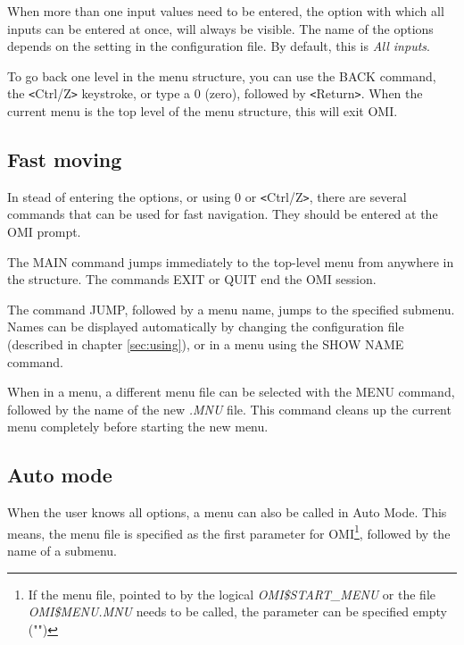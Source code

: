 \documentclass[a4paper]{book}
\newcommand{\vs}{\vspace{3mm}}
\newcommand{\lt}{\texttt{<}}
\newcommand{\gt}{\texttt{>}}
\begin{document}
\vs

When more than one input values need to be entered, the option with which all inputs can 
be entered at once, will always be visible. The name of the options depends 
on the setting in the configuration file. By default, this is \textsl{All inputs}.

\vs

To go back one level in the menu structure, you can use the \textsf{BACK} command, the \lt Ctrl/Z\gt{} keystroke, or type a \textsf{0} (zero), 
followed by \lt Return\gt . When the current menu is the top level of the menu 
structure, this will exit OMI.

\subsection{Fast moving}
\label{subsubsec:mylabel9}

In stead of entering the options, or using \textsf{0} or \lt Ctrl/Z\gt , there are 
several commands that can be used for fast navigation. They should be 
entered at the OMI prompt.

\vs

The \textsf{MAIN} command jumps immediately to the top-level 
menu from anywhere in the structure. The commands \textsf{EXIT} or \textsf{QUIT} end the OMI session.

\vs

The command \textsf{JUMP}, followed by a menu name, jumps to 
the specified submenu. Names can be displayed automatically by changing the 
configuration file (described in chapter \ref{sec:using}), or in a menu using the \textsf{SHOW 
NAME} command.

\vs

When in a menu, a different menu file can be selected with the \textsf{MENU} command, 
followed by the name of the new \textsl{.MNU} file. This command cleans up the 
current menu completely before starting the new menu.

\subsection{Auto mode}
\label{subsubsec:mylabel10}

When the user knows all options, a menu can also be called in Auto Mode. 
This means, the menu file is specified as the first parameter for 
OMI\footnote{ If the menu file, pointed to by the logical 
\textsl{OMI{\$}START{\_}MENU} or the file \textsl{OMI{\$}MENU.MNU} needs to be called,
the parameter can be specified empty (\textsf{""})}, followed by the name of a submenu.
\end{document}
